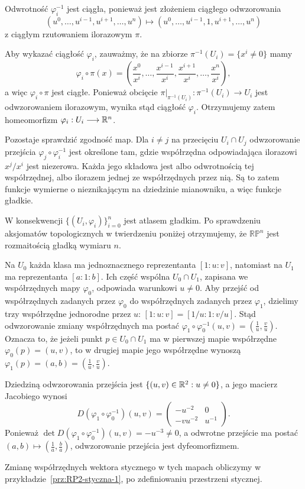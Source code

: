 \begin{przyklad}
Odwrotność $\varphi_i^{-1}$ jest ciągła, ponieważ jest złożeniem
ciągłego odwzorowania
\[
(u^0,\dots,u^{i-1},u^{i+1},\dots,u^n)
\longmapsto
(u^0,\dots,u^{i-1},1,u^{i+1},\dots,u^n)
\]
z ciągłym rzutowaniem ilorazowym $\pi$.

Aby wykazać ciągłość $\varphi_i$, zauważmy, że na zbiorze $\pi^{-1}(U_i)=\{x^i\neq0\}$
mamy
\[
\varphi_i\circ\pi(x)
=
\left(
\frac{x^0}{x^i},
\dots,
\frac{x^{i-1}}{x^i},
\frac{x^{i+1}}{x^i},
\dots,
\frac{x^n}{x^i}
\right),
\]
a więc $\varphi_i\circ\pi$ jest ciągłe. Ponieważ obcięcie $\pi|_{\pi^{-1}(U_i)}: \pi^{-1}(U_i)\longrightarrow U_i$
jest odwzorowaniem ilorazowym, wynika stąd ciągłość $\varphi_i$.
Otrzymujemy zatem homeomorfizm $\varphi_i:U_i\longrightarrow\mathbb{R}^n$.

Pozostaje sprawdzić zgodność map. Dla $i\neq j$ na przecięciu
$U_i\cap U_j$ odwzorowanie przejścia $\varphi_j\circ\varphi_i^{-1}$
jest określone tam, gdzie współrzędna odpowiadająca ilorazowi
$x^j/x^i$ jest niezerowa. Każda jego składowa jest albo odwrotnością
tej współrzędnej, albo ilorazem jednej ze współrzędnych przez nią.
Są to zatem funkcje wymierne o nieznikającym na dziedzinie
mianowniku, a więc funkcje gładkie.

W konsekwencji $\{(U_i,\varphi_i)\}_{i=0}^n$
jest atlasem gładkim. Po sprawdzeniu aksjomatów topologicznych
w twierdzeniu poniżej otrzymujemy, że $\mathbb{RP}^n$ jest
rozmaitością gładką wymiaru $n$.
\end{przyklad}


\begin{przyklad}\label{prz:RP2-przejscie-1}
Na $U_0$ każda klasa ma jednoznacznego reprezentanta $[1:u:v]$,
natomiast na $U_1$ ma reprezentanta $[a:1:b]$.
Ich część wspólna $U_0\cap U_1$, zapisana we współrzędnych mapy
$\varphi_0$, odpowiada warunkowi $u\neq0$. Aby przejść od współrzędnych
zadanych przez $\varphi_0$ do współrzędnych zadanych przez $\varphi_1$,
dzielimy trzy współrzędne jednorodne przez $u$: $[1:u:v] = [1/u:1:v/u]$.
Stąd odwzorowanie zmiany współrzędnych ma postać $\varphi_1\circ\varphi_0^{-1}(u,v) = \left(\frac1u,\frac vu\right)$.
Oznacza to, że jeżeli punkt $p\in U_0\cap U_1$ ma w pierwszej mapie
współrzędne $\varphi_0(p)=(u,v)$,
to w drugiej mapie jego współrzędne wynoszą $\varphi_1(p)=(a,b) = \left(\frac1u,\frac vu\right)$.

Dziedziną odwzorowania przejścia jest $\{(u,v)\in\mathbb{R}^2:u\neq0\}$,
a jego macierz Jacobiego wynosi
\[
D(\varphi_1\circ\varphi_0^{-1})(u,v)
=
\begin{pmatrix}
-u^{-2} & 0\\[1mm]
-vu^{-2} & u^{-1}
\end{pmatrix}.
\]
Ponieważ $\det D(\varphi_1\circ\varphi_0^{-1})(u,v) = -u^{-3}\neq0$,
a odwrotne przejście ma postać $(a,b)\longmapsto \left(\frac1a,\frac ba\right)$,
odwzorowanie przejścia jest dyfeomorfizmem.

Zmianę współrzędnych wektora stycznego w tych mapach obliczymy
w przykładzie~\ref{prz:RP2-styczna-1}, po zdefiniowaniu przestrzeni stycznej.
\end{przyklad}


